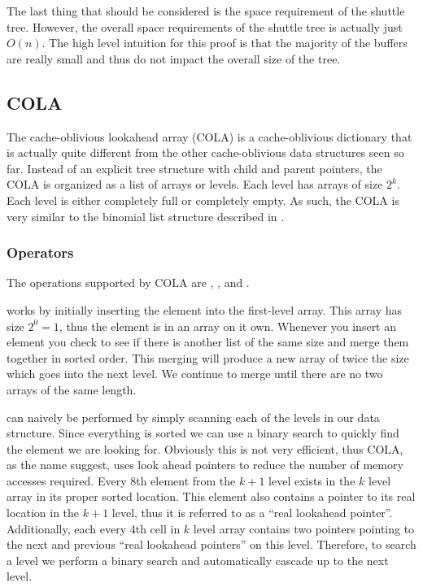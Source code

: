 \documentclass{style}
\begin{document}
The last thing that should be considered is the space requirement of the
shuttle tree. However, the overall space requirements of the shuttle tree is
actually just $O(n)$. The high level intuition for this proof is that the
majority of the buffers are really small and thus do not impact the overall
size of the tree.

\subsection{COLA}

The cache-oblivious lookahead array (COLA) is a cache-oblivious dictionary
that is actually quite different from the other cache-oblivious data
structures seen so far. Instead of an explicit tree structure with child and
parent pointers, the COLA is organized as a list of arrays or levels. Each
level has arrays of size $2^k$. Each level is either completely full or
completely empty. As such, the COLA is very similar to the binomial list
structure described in \cite{BentleySaxe}.

\subsubsection{Operators}

The operations supported by COLA are \Search, \Insert, and \Scan.

\Insert works by initially inserting the element into the first-level array.
This array has size $2^0 = 1$, thus the element is in an array on it own.
Whenever you insert an element you check to see if there is another list of
the same size and merge them together in sorted order. This merging will
produce a new array of twice the size which goes into the next level. We
continue to merge until there are no two arrays of the same length.

\Search can naively be performed by simply scanning each of the levels in our
data structure. Since everything is sorted we can use a binary search to
quickly find the element we are looking for. Obviously this is not very
efficient, thus COLA, as the name suggest, uses look ahead pointers to reduce
the number of memory accesses required. Every 8th element from the $k+1$ level
exists in the $k$ level array in its proper sorted location. This element also
contains a pointer to its real location in the $k+1$ level, thus it is
referred to as a ``real lookahead pointer''. Additionally, each every 4th cell
in $k$ level array contains two pointers pointing to the next and previous
``real lookahead pointers'' on this level. Therefore, to search a level we
perform a binary search and automatically cascade up to the next level.
\end{document}
